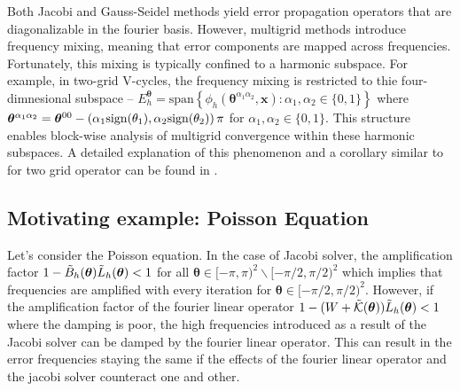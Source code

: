 \documentclass[12pt]{article}
\begin{document}
Both Jacobi and Gauss-Seidel methods yield error propagation operators that are diagonalizable in the fourier basis. However, multigrid methods introduce frequency mixing, meaning that error components are mapped across frequencies. Fortunately, this mixing is typically confined to a harmonic subspace. For example, in two-grid V-cycles, the frequency mixing is restricted to thie four-dimnesional subspace -- $E^{\boldsymbol{\theta}}_h = \text{span} \left\{\phi_h(\boldsymbol{\theta}^{\alpha_1\alpha_2}, \mathbf{x}): \alpha_1 , \alpha_2 \in \{0, 1\}\right\}$ where $\boldsymbol{\theta}^{\alpha_1\alpha_2} = \boldsymbol{\theta}^{00} - \left(\alpha_1 \text{sign} (\theta_1), \alpha_2 \text{sign} (\theta_2)\right)\pi$ for $\alpha_1, \alpha_2 \in \{0, 1\}$. This structure enables block-wise analysis of multigrid convergence within these harmonic subspaces. A detailed explanation of this phenomenon and a corollary similar to  for two grid operator can be found in . 

\subsection{Motivating example: Poisson Equation}

Let's consider the Poisson equation. In the case of Jacobi solver, the amplification factor $1 - \Tilde{B}_{h}(\boldsymbol{\theta})\Tilde{L}_h(\boldsymbol{\theta}) < 1$ for all $\boldsymbol{\theta} \in [-\pi, \pi)^2 \backslash [-\pi/2, \pi/2)^2$ which implies that frequencies are amplified with every iteration for $\boldsymbol{\theta} \in [-\pi/2, \pi/2)^2$. However, if the amplification factor of the fourier linear operator $1 - (W + \Tilde{\mathcal{K}}(\boldsymbol{\theta}))\Tilde{L}_h(\boldsymbol{\theta}) < 1$ where the damping is poor, the high frequencies introduced as a result of the Jacobi solver can be damped by the fourier linear operator. This can result in the error frequencies staying the same if the effects of the fourier linear operator and the jacobi solver counteract one and other. 




\end{document}
